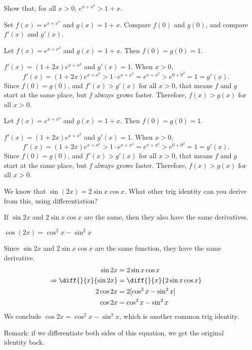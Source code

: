 \begin{question}[test]\label{s2.9ineq}
Show that, for all $x>0$, $e^{x+x^2}>1+x$.
\end{question}
\begin{hint}  Set $f(x) = e^{x+x^2}$ and $g(x)=1+x$. Compare $f(0)$ and $g(0)$,
         and compare $f'(x)$ and $g'(x)$.
\end{hint}
\begin{answer} Let $f(x)=e^{x+x^2}$ and $g(x)=1+x$. Then $f(0)=g(0)=1$.

$f'(x)=(1+2x)e^{x+x^2}$ and $g'(x)=1$. When $x>0$,
\[f'(x)=(1+2x)e^{x+x^2}>1\cdot e^{x+x^2}=e^{x+x^2}>e^{0+0^2}=1=g'(x).\] Since $f(0)=g(0)$, and $f'(x)>g'(x)$ for all $x>0$, that means $f$ and $g$ start at the same place, but $f$ always grows faster. Therefore, $f(x)>g(x)$ for all $x>0$.
\end{answer}
\begin{solution} Let $f(x)=e^{x+x^2}$ and $g(x)=1+x$. Then $f(0)=g(0)=1$.

$f'(x)=(1+2x)e^{x+x^2}$ and $g'(x)=1$. When $x>0$,
\[f'(x)=(1+2x)e^{x+x^2}>1\cdot e^{x+x^2}=e^{x+x^2}>e^{0+0^2}=1=g'(x).\] Since $f(0)=g(0)$, and $f'(x)>g'(x)$ for all $x>0$, that means $f$ and $g$ start at the same place, but $f$ always grows faster. Therefore, $f(x)>g(x)$ for all $x>0$.
\end{solution}


\begin{Mquestion}
We know that $\sin (2x) = 2\sin x \cos x$. What other trig identity can you derive from this, using differentiation?
\end{Mquestion}
\begin{hint}
If $\sin 2x$ and $2\sin x \cos x$ are the same, then they also have the same derivatives.
\end{hint}
\begin{answer}
$\cos(2x)=\cos^2x-\sin^2x$
\end{answer}
\begin{solution}
Since $\sin 2x$ and $2\sin x \cos x$ are the same function, they have the same derivative.
\begin{align*}
\sin 2x &= 2\sin x \cos x\\
\Rightarrow \diff{}{x}\{\sin 2x\}&=\diff{}{x}\{2\sin x \cos x\}\\
2\cos 2x &=2[\cos^2x-\sin^2x]\\
\cos 2x &=\cos^2x-\sin^2 x
\end{align*}
We conclude $\cos 2x =\cos^2x-\sin^2 x$, which is another common trig identity.

Remark: if we differentiate both sides of this equation, we get the original identity back.
\end{solution}


